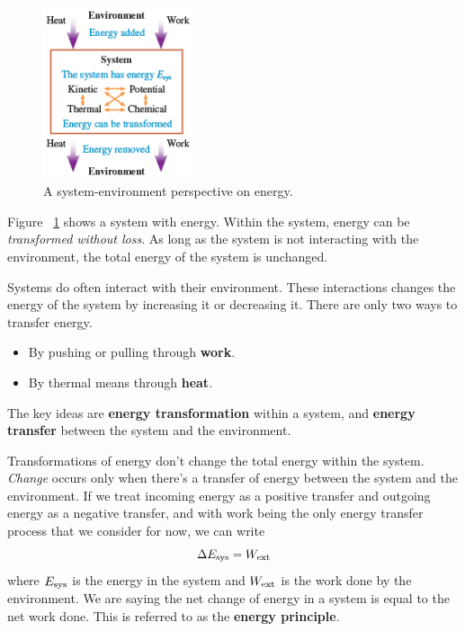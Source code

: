 \begin{figure}
    \centering
    \includegraphics[width=0.4\textwidth]{../figures/system-environment-energy.png}
    \caption{A system-environment perspective on energy.}%
    \label{fig:system-environment-energy}

\end{figure}

Figure~%
\ref{fig:system-environment-energy} shows a system with energy.  Within
the system, energy can be \emph{transformed without loss}.  As long as
the system is not interacting with the environment, the total energy of
the system is unchanged.

Systems do often interact with their environment.  These interactions
changes the energy of the system by increasing it or decreasing it.
There are only two ways to transfer energy.
\begin{itemize}
    \item
        By pushing or pulling through \textbf{work}.
    \item
        By thermal means through \textbf{heat}.
\end{itemize}

The key ideas are \textbf{energy transformation} within a system, and
\textbf{energy transfer} between the system and the environment.

Transformations of energy don't change the total energy within the
system.  \emph{Change} occurs only when there's a transfer of energy
between the system and the environment.  If we treat incoming energy as
a positive transfer and outgoing energy as a negative transfer, and with
work being the only energy transfer process that we consider for now, we
can write
\begin{equation}
    \Delta E_{\mathrm{sys}} = W_{\mathrm{ext}}
\end{equation}
where
$
    E_{\mathrm{sys}}
$ is the energy in the system and
$
    W_{\mathrm{ext}}
$ is the work done by the environment.  We are saying the net change of
energy in a system is equal to the net work done.  This is referred to
as the \textbf{energy principle}.

